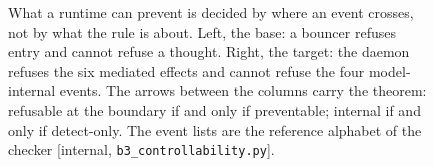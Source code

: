 \begin{figure}[H]
\caption{What a runtime can prevent is decided by where an event crosses, not by what the rule is
about. Left, the base: a bouncer refuses entry and cannot refuse a thought. Right, the target: the
daemon refuses the six mediated effects and cannot refuse the four model-internal events. The arrows
between the columns carry the theorem: refusable at the boundary if and only if preventable; internal
if and only if detect-only. The event lists are the reference alphabet of the checker [internal,
\texttt{b3\_controllability.py}].}
\label{fig:swk-controllability-relation}
\end{figure}
